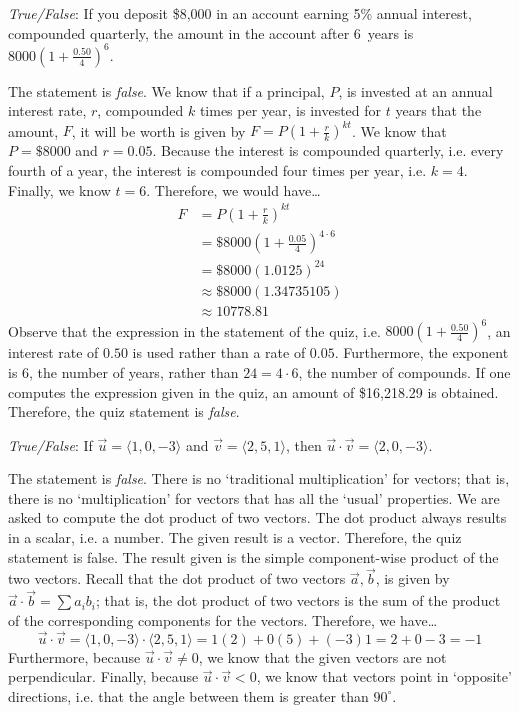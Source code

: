 \documentclass[11pt,letterpaper]{article}
\begin{document}
\quizsol \textit{True/False}: If you deposit \$8,000 in an account earning 5\% annual interest, compounded quarterly, the amount in the account after 6~years is $8000 \left(1 + \frac{0.50}{4} \right)^6$. \pspace

\sol The statement is \textit{false}. We know that if a principal, $P$, is invested at an annual interest rate, $r$, compounded $k$ times per year, is invested for $t$ years that the amount, $F$, it will be worth is given by $F= P \left(1 + \frac{r}{k} \right)^{kt}$. We know that $P= \$8000$ and $r= 0.05$. Because the interest is compounded quarterly, i.e. every fourth of a year, the interest is compounded four times per year, i.e. $k= 4$. Finally, we know $t= 6$. Therefore, we would have\dots
	\[
	\begin{aligned}
	F&= P \left(1 + \frac{r}{k} \right)^{kt} \\
	&= \$8000 \left(1 + \frac{0.05}{4} \right)^{4 \cdot 6} \\
	&= \$8000 (1.0125)^{24} \\
	&\approx \$8000 (1.34735105) \\
	&\approx10778.81	
	\end{aligned}
	\]
Observe that the expression in the statement of the quiz, i.e. $8000 \left(1 + \frac{0.50}{4} \right)^6$, an interest rate of $0.50$ is used rather than a rate of $0.05$. Furthermore, the exponent is 6, the number of years, rather than $24= 4 \cdot 6$, the number of compounds. If one computes the expression given in the quiz, an amount of \$16,218.29 is obtained. Therefore, the quiz statement is \textit{false}. \pvspace{1.3cm}



\quizsol \textit{True/False}: If $\vec{u}= \langle 1, 0, -3 \rangle$ and $\vec{v}= \langle 2, 5, 1 \rangle$, then $\vec{u} \cdot \vec{v}= \langle 2, 0, -3 \rangle$. \pspace

\sol The statement is \textit{false}. There is no `traditional multiplication' for vectors; that is, there is no `multiplication' for vectors that has all the `usual' properties. We are asked to compute the dot product of two vectors. The dot product always results in a scalar, i.e. a number. The given result is a vector. Therefore, the quiz statement is false. The result given is the simple component-wise product of the two vectors.  Recall that the dot product of two vectors $\vec{a}, \vec{b}$, is given by $\vec{a} \cdot \vec{b}= \sum a_i b_i$; that is, the dot product of two vectors is the sum of the product of the corresponding components for the vectors. Therefore, we have\dots
	\[
	\vec{u} \cdot \vec{v}= \langle 1, 0, -3 \rangle \cdot \langle 2, 5, 1 \rangle= 1(2) + 0(5) + (-3)1= 2 + 0 - 3= -1
	\]
Furthermore, because $\vec{u} \cdot \vec{v} \neq 0$, we know that the given vectors are not perpendicular. Finally, because $\vec{u} \cdot \vec{v} < 0$, we know that vectors point in `opposite' directions, i.e. that the angle between them is greater than $90^\circ$. \pvspace{1.0cm}
\end{document}
